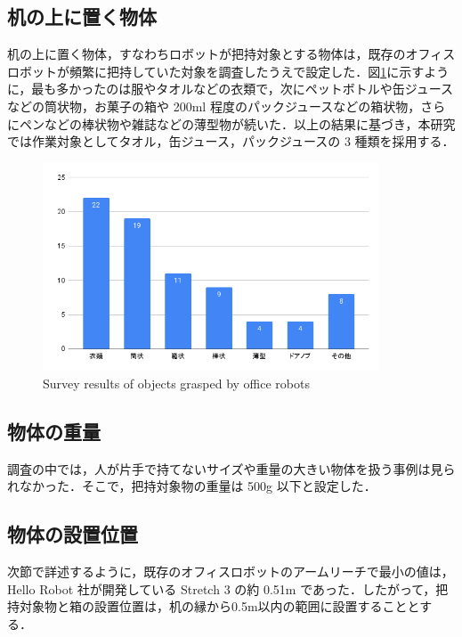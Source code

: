 \subsection{机の上に置く物体}
机の上に置く物体，すなわちロボットが把持対象とする物体は，既存のオフィスロボットが頻繁に把持していた対象を調査したうえで設定した．図\ref{fig:handget}に示すように，最も多かったのは服やタオルなどの衣類で，次にペットボトルや缶ジュースなどの筒状物，お菓子の箱や 200ml 程度のパックジュースなどの箱状物，さらにペンなどの棒状物や雑誌などの薄型物が続いた．以上の結果に基づき，本研究では作業対象としてタオル，缶ジュース，パックジュースの 3 種類を採用する．
\begin{figure}[h]
  \centering
  \includegraphics[width=10cm]{images/2syou/handget.png}
  \caption{Survey results of objects grasped by office robots}
  \label{fig:handget}
\end{figure}
\clearpage
\subsection{物体の重量}
調査の中では，人が片手で持てないサイズや重量の大きい物体を扱う事例は見られなかった．そこで，把持対象物の重量は 500g 以下と設定した．
\subsection{物体の設置位置}
次節で詳述するように，既存のオフィスロボットのアームリーチで最小の値は，Hello Robot 社が開発している Stretch 3 の約 0.51m であった．したがって，把持対象物と箱の設置位置は，机の縁から0.5m以内の範囲に設置することとする．
\newpage